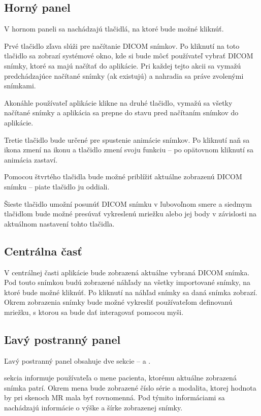 \subsection {Horný panel}
V hornom paneli sa nachádzajú tlačidlá, na ktoré bude možné kliknúť.

Prvé tlačidlo zľava slúži pre načítanie DICOM snímkov. Po kliknutí na toto tlačidlo sa zobrazí systémové okno, kde si bude môcť používateľ vybrať DICOM snímky, ktoré sa majú načítať do aplikácie. Pri každej tejto akcii sa vymažú predchádzajúce načítané snímky (ak existujú) a nahradia sa práve zvolenými snímkami.

Akonáhle používateľ aplikácie klikne na druhé tlačidlo, vymažú sa všetky načítané snímky a aplikácia sa prepne do stavu pred načítaním snímkov do aplikácie.

Tretie tlačidlo bude určené pre spustenie animácie snímkov. Po kliknutí naň sa ikona zmení na  ikonu a tlačidlo zmení svoju funkciu -- po opätovnom kliknutí sa animácia zastaví.

Pomocou štvrtého tlačidla bude možné priblížiť aktuálne zobrazenú DICOM snímku -- piate tlačidlo ju oddiali.

Šieste tlačidlo umožní posunúť DICOM snímku v ľubovoľnom smere a siedmym tlačidlom bude možné presúvať vykreslenú mriežku alebo jej body v závislosti na aktuálnom nastavení tohto tlačidla.

\subsection {Centrálna časť}
V centrálnej časti aplikácie bude zobrazená aktuálne vybraná DICOM snímka. Pod touto snímkou budú zobrazené náhľady na všetky importované snímky, na ktoré bude možné kliknúť. Po kliknutí na náhľad snímky sa daná snímka zobrazí. Okrem zobrazenia snímky bude možné vykresliť používateľom definovanú mriežku, s ktorou sa bude dať interagovať pomocou myši.

\subsection {Ľavý postranný panel}
Ľavý postranný panel obsahuje dve sekcie --  a .

 sekcia informuje používateľa o mene pacienta, ktorému aktuálne zobrazená snímka patrí. Okrem mena bude zobrazené číslo série a modalita, ktorej hodnota by pri skenoch MR mala byť rovnomenná. Pod týmito informáciami sa nachádzajú informácie o výške a šírke zobrazenej snímky.

